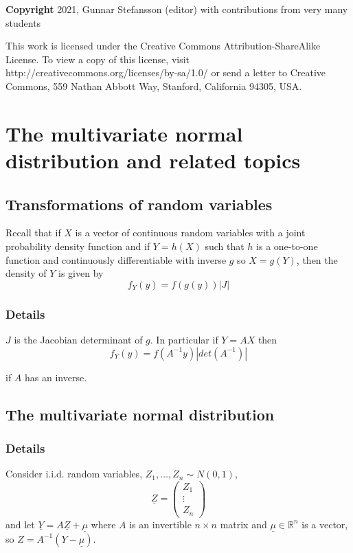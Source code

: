 \documentclass[12pt,a4paper]{article}
\theoremstyle{regla}
\theoremstyle{remark}
\theoremstyle{definition}
\theoremstyle{nonumberbreak}
\begin{document}
{\bf Copyright}
2021, Gunnar Stefansson (editor) with contributions from very many students

This work is licensed under the Creative Commons
Attribution-ShareAlike License. To view a copy of this license, visit
http://creativecommons.org/licenses/by-sa/1.0/ or send a letter to
Creative Commons, 559 Nathan Abbott Way, Stanford, California 94305,
USA.
\clearpage
\section{The multivariate normal distribution and related topics}
\subsection{Transformations of random variables}
\begin{fbox}
\begin{minipage}{0.97\textwidth}
Recall that if $X$ is a vector of continuous random variables with a joint probability density function and if $Y=h(X)$ such that $h$ is a one-to-one function and continuously differentiable with inverse $g$ so $X= g(Y)$, then the density of $Y$ is given by 
$$ f_Y(y)=f(g(y))|J|$$
\end{minipage}
\end{fbox}
\subsubsection{Details}
$J$ is the Jacobian determinant of $g$. In particular if $Y=AX$ then 
$$ f_Y(y)=f(A^{-1}y)|det(A^{-1})|$$

if $A$ has an inverse.

\subsection{The multivariate normal distribution}
\subsubsection{Details}
Consider i.i.d. random variables, $Z_1, \ldots ,Z_n \sim N(0,1)$,
$$\underline{Z}=
\left( \begin{array}{ccc}
 Z_1 \\
 \vdots\\
 Z_n
\end{array} \right)$$
and let
$\underline{Y}=A \underline{Z} + \underline{\mu}$ where $A$ is an
invertible $n \times n$ matrix and $\underline{\mu} \in \mathbb{R}^n$ is a
vector, so $Z= A^{-1}(Y-\underline{\mu})$.
\end{document}
